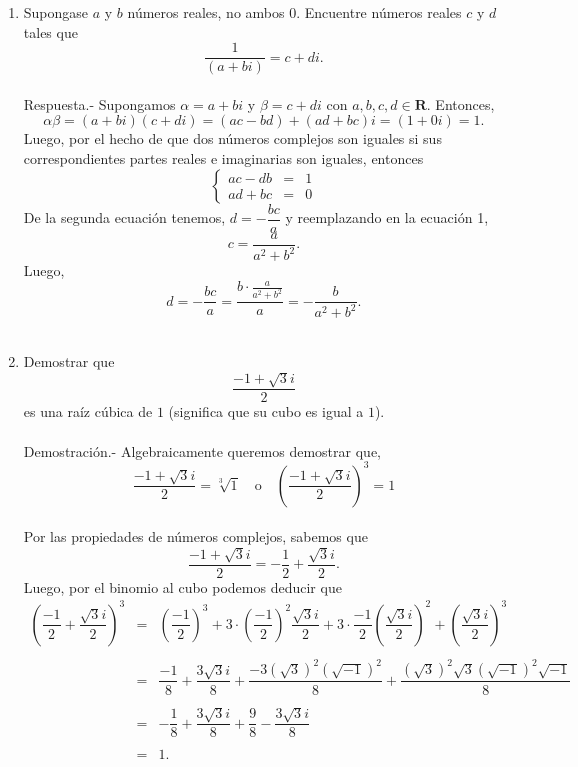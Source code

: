 \begin{enumerate}[\bfseries 1.]

    \item Supongase $a$ y $b$ números reales, no ambos $0$. Encuentre números reales $c$ y $d$ tales que
    $$\dfrac{1}{(a+bi)}=c+di.$$\\
	Respuesta.-\; Supongamos $\alpha=a+bi$ y $\beta=c+di$ con $a,b,c,d\in \textbf{R}$. Entonces,
	$$\alpha\beta = (a+bi)(c+di) = (ac-bd)+(ad+bc)i=(1+0i)=1.$$
	Luego, por el hecho de que dos números complejos son iguales si sus correspondientes partes reales e imaginarias son iguales, entonces
	$$\left\{\begin{array}{rcl}
	    ac-db & = & 1\\
	    ad+bc & = & 0
	\end{array}\right.$$
	De la segunda ecuación tenemos, $d=-\dfrac{bc}{a}$ y reemplazando en la ecuación 1, 
	$$c=\dfrac{a}{a^2+b^2}.$$
	Luego,
	$$d=-\dfrac{bc}{a}=\dfrac{b\cdot \frac{a}{a^2+b^2}}{a}=-\dfrac{b}{a^2+b^2}.$$\\

    \item Demostrar que 
    $$\dfrac{-1+\sqrt{3}i}{2}$$
    es una raíz cúbica de $1$ (significa que su cubo es igual a $1$).\\\\
	Demostración.-\; Algebraicamente queremos demostrar que,
	$$\dfrac{-1+\sqrt{3}i}{2}=\sqrt[3]{1} \quad \mbox{o}\quad \left(\dfrac{-1+\sqrt{3}i}{2}\right)^3=1$$\\
	Por las propiedades de números complejos, sabemos que
	$$\dfrac{-1+\sqrt{3}i}{2}=-\dfrac{1}{2}+\dfrac{\sqrt{3}i}{2}.$$
	Luego, por el binomio al cubo podemos deducir que
	$$\begin{array}{rcl}
	    \left(\dfrac{-1}{2}+\dfrac{\sqrt{3}i}{2}\right)^3 &=&\left(\dfrac{-1}{2}\right)^3 + 3\cdot \left(\dfrac{-1}{2}\right)^2 \dfrac{\sqrt{3}i}{2} + 3\cdot \dfrac{-1}{2}\left(\dfrac{\sqrt{3}i}{2}\right)^2+\left(\dfrac{\sqrt{3}i}{2}\right)^3\\\\
							      &=&\dfrac{-1}{8}+\dfrac{3\sqrt{3}i}{8}+\dfrac{-3(\sqrt{3})^2(\sqrt{-1})^2}{8}+\dfrac{(\sqrt{3})^2\sqrt{3}(\sqrt{-1})^2\sqrt{-1}}{8}\\\\
							      &=&-\dfrac{1}{8}+\dfrac{3\sqrt{3}i}{8}+\dfrac{9}{8}-\dfrac{3\sqrt{3}i}{8}\\\\
							      &=&1.
	\end{array}$$
	\vspace{0.5cm}


\end{enumerate}
